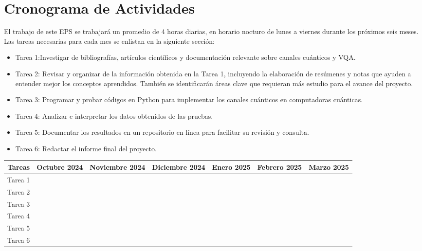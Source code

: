 \section{Cronograma de Actividades}
El trabajo de este EPS se trabajará un promedio de 4 horas diarias, en horario nocturo de lunes a viernes durante los próximos seis meses. Las tareas necesarias para cada mes se enlistan en la siguiente sección: 

\begin{itemize}
        \item Tarea 1:Investigar de bibliografías, artículos científicos y documentación relevante sobre canales cuánticos y VQA. 
    \item Tarea 2: Revisar y organizar de la información obtenida en la Tarea 1, incluyendo la elaboración de resúmenes y notas que ayuden a entender mejor los conceptos aprendidos. También se identificarán áreas clave que requieran más estudio para el avance del proyecto.
    
    \item Tarea 3: Programar y probar códigos en Python para implementar los canales cuánticos en computadoras cuánticas.
    \item Tarea 4: Analizar e interpretar los datos obtenidos de las pruebas.
    \item Tarea 5: Documentar los resultados en un repositorio en línea para facilitar su revisión y consulta.
    \item Tarea 6: Redactar el informe final del proyecto.
\end{itemize}


\begin{center}
\begingroup
\small %
\setlength{\tabcolsep}{4pt} %
\renewcommand{\arraystretch}{1.0} %
\begin{tabular}{|c|c|c|c|c|c|c|}
\hline
\textbf{Tareas} & \textbf{Octubre 2024} & \textbf{Noviembre 2024} & \textbf{Diciembre 2024} & \textbf{Enero 2025} & \textbf{Febrero 2025} & \textbf{Marzo 2025}\\ \hline
Tarea 1 & \cellcolor[gray]{0.5} &  & & & & \\ \hline
Tarea 2 & \cellcolor[gray]{0.5} & \cellcolor[gray]{0.5} & & & & \\ \hline
Tarea 3 & & & \cellcolor[gray]{0.5} & & & \\ \hline
Tarea 4 & & & \cellcolor[gray]{0.5} & \cellcolor[gray]{0.5} & & \\ \hline
Tarea 5 & & & \cellcolor[gray]{0.5} & \cellcolor[gray]{0.5} & & \\ \hline
Tarea 6 & & & &  \cellcolor[gray]{0.5}& \cellcolor[gray]{0.5} & \cellcolor[gray]{0.5} \\ \hline
\end{tabular}
\endgroup
\end{center}
